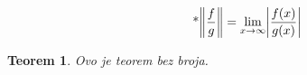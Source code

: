 \documentclass{article}
\newtheorem*{theorem-non}{Teorem}
\begin{document}
\begin{equation}\tag*{*}
\norm{ \frac{f}{g} } = \lim_{x \to \infty}  \abs{\frac{f(x)}{g(x)}}
\end{equation}

\begin{theorem-non}
Ovo je teorem bez broja.
\end{theorem-non}
\end{document}
